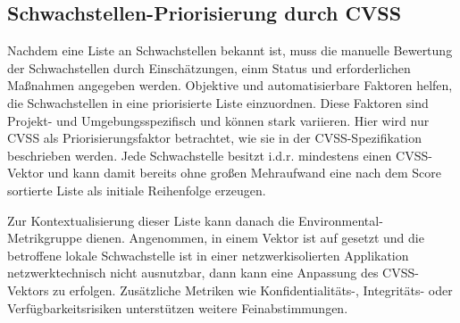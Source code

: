 \subsection{Schwachstellen-Priorisierung durch CVSS} \label{subsec:projektbericht-grundlagen-vulnerability-assessment}

Nachdem eine Liste an Schwachstellen bekannt ist, muss die manuelle Bewertung der Schwachstellen durch Einschätzungen, einm Status und erforderlichen Maßnahmen angegeben werden.
Objektive und automatisierbare Faktoren helfen, die Schwachstellen in eine priorisierte Liste einzuordnen.
Diese Faktoren sind Projekt- und Umgebungsspezifisch und können stark variieren.
Hier wird nur CVSS als Priorisierungsfaktor betrachtet, wie sie in der CVSS-Spezifikation beschrieben werden.
Jede Schwachstelle besitzt i.d.r. mindestens einen CVSS-Vektor und kann damit bereits ohne großen Mehraufwand eine nach dem Score sortierte Liste als initiale Reihenfolge erzeugen.

Zur Kontextualisierung dieser Liste kann danach die Environmental-Metrikgruppe dienen.
Angenommen, in einem Vektor ist  auf  gesetzt und die betroffene lokale Schwachstelle ist in einer netzwerkisolierten Applikation netzwerktechnisch nicht ausnutzbar, dann kann eine Anpassung des CVSS-Vektors zu  erfolgen.
Zusätzliche Metriken wie Konfidentialitäts-, Integritäts- oder Verfügbarkeitsrisiken unterstützen weitere Feinabstimmungen.
